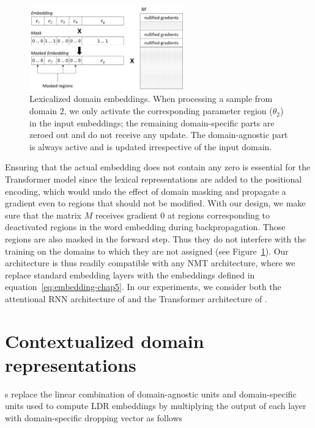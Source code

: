 \begin{figure}[h!]
  \center
  \includegraphics[width=0.6\textwidth]{graphics/embeddings}
  \caption{Lexicalized domain embeddings. When processing a sample from domain $2$, we only activate the corresponding parameter region ($\theta_2$) in the input embeddings; the remaining domain-specific parts are zeroed out and do not receive any update. The domain-agnostic part is always active and is updated irrespective of the input domain.} 
  \label{fig:network-chap5}
\end{figure}

Ensuring that the actual embedding does not contain any zero is essential for the Transformer model since the lexical representations are added to the positional encoding, which would undo the effect of domain masking and propagate a gradient even to regions that should not be modified. With our design, we make sure that the matrix $M$ receives gradient $0$ at regions corresponding to deactivated regions in the word embedding during backpropagation. Those regions are also masked in the forward step. Thus they do not interfere with the training on the domains to which they are not assigned (see Figure~\ref{fig:network-chap5}). Our architecture is thus readily compatible with any NMT architecture, where we replace standard embedding layers with the embeddings defined in equation~\eqref{eq:embedding-chap5}. In our experiments, we consider both the attentional RNN architecture of \citet{Bahdanau15learning} and the Transformer architecture of \citet{Vaswani17attention}.

\section{Contextualized domain representations}
\label{sec:sparse-chap5}
s replace the linear combination of domain-agnostic units and domain-specific units used to compute LDR embeddings by multiplying the output of each layer with domain-specific dropping vector as follows

